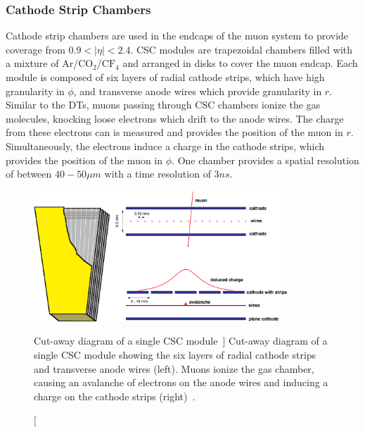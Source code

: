 \subsubsection{Cathode Strip Chambers} \label{sec:CMS_CSC}
Cathode strip chambers are used in the endcaps of the muon system to provide coverage from $0.9<\left|\eta\right|<2.4$. CSC modules are trapezoidal chambers filled with a mixture of Ar/$\text{CO}_2$/$\text{CF}_4$ and arranged in disks to cover the muon endcap. Each module is composed of six layers of radial cathode strips, which have high granularity in $\phi$, and transverse anode wires which provide granularity in $r$. Similar to the DTs, muons passing through CSC chambers ionize the gas molecules, knocking loose electrons which drift to the anode wires. The charge from these electrons can is measured and provides the position of the muon in $r$. Simultaneously, the electrons induce a charge in the cathode strips, which provides the position of the muon in $\phi$. One chamber provides a spatial resolution of between $40-50\unit{\mu m}$ with a time resolution of $3\unit{ns}$.

\begin{figure}[htpb]
	\centering
	\includegraphics[width=0.85\textwidth]{figs/03_experiment/cms_csc.pdf}
	\caption
	[Cut-away diagram of a single CSC module~\cite{DeBruyn:2797803}]
	{Cut-away diagram of a single CSC module showing the six layers of radial cathode strips and transverse anode wires (left). Muons ionize the gas chamber, causing an avalanche of electrons on the anode wires and inducing a charge on the cathode strips (right)~\cite{DeBruyn:2797803}.}
	\label{fig:CSC}
\end{figure}

